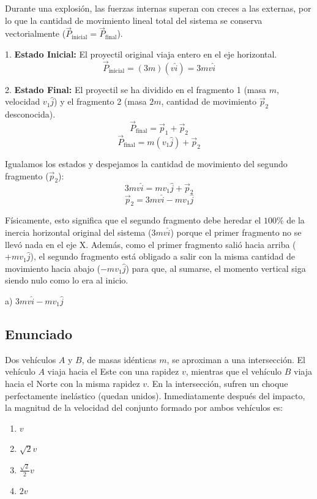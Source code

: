 \documentclass[12pt, a4paper]{article}
\begin{document}
Durante una explosión, las fuerzas internas superan con creces a las externas, por lo que la cantidad de movimiento lineal total del sistema se conserva vectorialmente ($\vec{P}_{\text{inicial}} = \vec{P}_{\text{final}}$).

1. \textbf{Estado Inicial:} El proyectil original viaja entero en el eje horizontal.
$$ \vec{P}_{\text{inicial}} = (3m)(v\hat{i}) = 3mv\hat{i} $$

2. \textbf{Estado Final:} El proyectil se ha dividido en el fragmento 1 (masa $m$, velocidad $v_1\hat{j}$) y el fragmento 2 (masa $2m$, cantidad de movimiento $\vec{p}_2$ desconocida).
$$ \vec{P}_{\text{final}} = \vec{p}_1 + \vec{p}_2 $$
$$ \vec{P}_{\text{final}} = m(v_1\hat{j}) + \vec{p}_2 $$

Igualamos los estados y despejamos la cantidad de movimiento del segundo fragmento ($\vec{p}_2$):
$$ 3mv\hat{i} = mv_1\hat{j} + \vec{p}_2 $$
$$ \vec{p}_2 = 3mv\hat{i} - mv_1\hat{j} $$

Físicamente, esto significa que el segundo fragmento debe heredar el $100\%$ de la inercia horizontal original del sistema ($3mv\hat{i}$) porque el primer fragmento no se llevó nada en el eje X. Además, como el primer fragmento salió hacia arriba ($+mv_1\hat{j}$), el segundo fragmento está obligado a salir con la misma cantidad de movimiento hacia abajo ($-mv_1\hat{j}$) para que, al sumarse, el momento vertical siga siendo nulo como lo era al inicio.

\begin{tcolorbox}[colback=green!5!white, colframe=green!50!black, title=Respuesta Final]
\centering \Large a) $3mv\hat{i} - mv_1\hat{j}$
\end{tcolorbox}

\newpage

\subsection*{Enunciado}
Dos vehículos $A$ y $B$, de masas idénticas $m$, se aproximan a una intersección. El vehículo $A$ viaja hacia el Este con una rapidez $v$, mientras que el vehículo $B$ viaja hacia el Norte con la misma rapidez $v$. En la intersección, sufren un choque perfectamente inelástico (quedan unidos). Inmediatamente después del impacto, la magnitud de la velocidad del conjunto formado por ambos vehículos es:
\begin{enumerate}[label=\alph*)]
    \item $v$
    \item $\sqrt{2}v$
    \item $\frac{\sqrt{2}}{2}v$
    \item $2v$
\end{enumerate}
\end{document}
